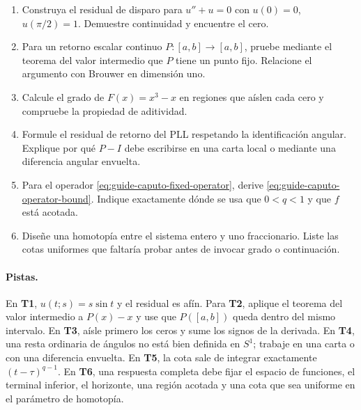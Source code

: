 \begin{enumerate}[label=\textbf{T\arabic*.}]
 \item Construya el residual de disparo para $u''+u=0$ con
 $u(0)=0$, $u(\pi/2)=1$. Demuestre continuidad y encuentre el cero.
 \item Para un retorno escalar continuo $P:[a,b]\to[a,b]$, pruebe mediante el
 teorema del valor intermedio que $P$ tiene un punto fijo. Relacione el
 argumento con Brouwer en dimensión uno.
 \item Calcule el grado de $F(x)=x^3-x$ en regiones que aíslen cada cero y
 compruebe la propiedad de aditividad.
 \item Formule el residual de retorno del PLL respetando la identificación
 angular. Explique por qué $P-I$ debe escribirse en una carta local o mediante
 una diferencia angular envuelta.
 \item Para el operador \cref{eq:guide-caputo-fixed-operator}, derive
 \cref{eq:guide-caputo-operator-bound}. Indique exactamente dónde se usa que
 $0<q<1$ y que $f$ está acotada.
 \item Diseñe una homotopía entre el sistema entero y uno fraccionario. Liste
 las cotas uniformes que faltaría probar antes de invocar grado o continuación.
\end{enumerate}

\paragraph{Pistas.}
En \textbf{T1}, $u(t;s)=s\sin t$ y el residual es afín. Para \textbf{T2},
aplique el teorema del valor intermedio a $P(x)-x$ y use que $P([a,b])$ queda
dentro del mismo intervalo. En \textbf{T3}, aísle primero los ceros y sume los
signos de la derivada. En \textbf{T4}, una resta ordinaria de ángulos no está
bien definida en $S^1$; trabaje en una carta o con una diferencia envuelta. En
\textbf{T5}, la cota sale de integrar exactamente
$(t-\tau)^{q-1}$. En \textbf{T6}, una respuesta completa debe fijar el espacio
de funciones, el terminal inferior, el horizonte, una región acotada y una
cota que sea uniforme en el parámetro de homotopía.
\fi
